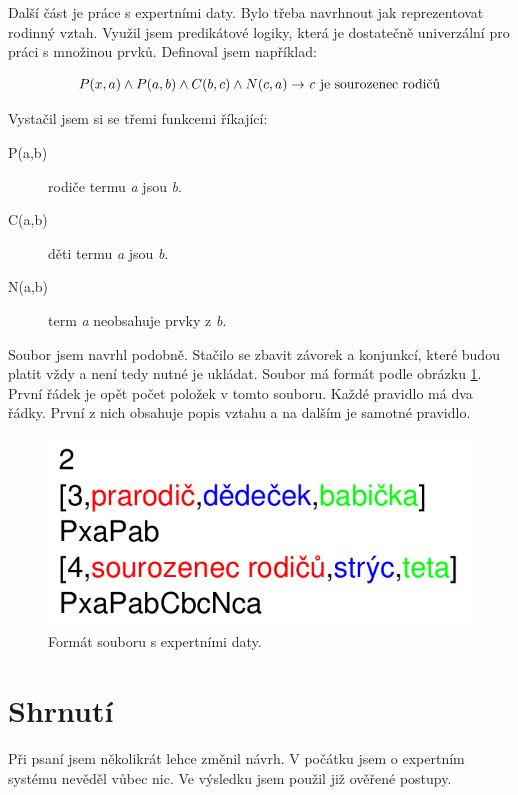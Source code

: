 \documentclass[a4paper, 12pt]{article}
\begin{document}
Další část je práce s expertními daty. Bylo třeba navrhnout jak
reprezentovat rodinný vztah. Využil jsem predikátové logiky,
která je dostatečně univerzální pro práci s množinou prvků.
Definoval jsem například:

\begin{displaymath}
P(x,a) \wedge P(a,b) \wedge C(b,c) \wedge N(c,a) \rightarrow \mbox{\emph{c} je sourozenec rodičů}
\end{displaymath}

Vystačil jsem si se třemi funkcemi říkající:
\begin{description}
\item[P(a,b)] rodiče termu \emph{a} jsou \emph{b}.
\item[C(a,b)] děti termu \emph{a} jsou \emph{b}.
\item[N(a,b)] term \emph{a} neobsahuje prvky z \emph{b}.
\end{description}

Soubor jsem navrhl podobně. Stačilo se zbavit závorek a konjunkcí,
které budou platit vždy a není tedy nutné je ukládat. Soubor má formát
podle obrázku \ref{fig:expert}. První řádek je opět počet položek
v tomto souboru. Každé pravidlo má dva řádky. První z nich obsahuje
popis vztahu a na dalším je samotné pravidlo.

\begin{figure}
\centering
\includegraphics{format_expert}
\caption{Formát souboru s expertními daty.}
\label{fig:expert}
\end{figure}

\section{Shrnutí}
Při psaní jsem několikrát lehce změnil návrh. V počátku jsem o expertním
systému nevěděl vůbec nic. Ve výsledku jsem použil již ověřené postupy.
\end{document}
